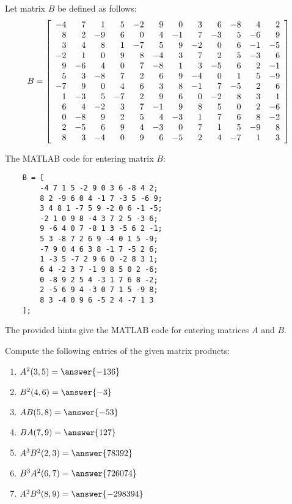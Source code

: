 \documentclass{ximera}
\begin{document}
\begin{exercise}
    Let matrix \( B \) be defined as follows:
    \[
    B = \startmat{rrrrrrrrrrrr}
        -4 & 7 & 1 & 5 & -2 & 9 & 0 & 3 & 6 & -8 & 4 & 2 \\
        8 & 2 & -9 & 6 & 0 & 4 & -1 & 7 & -3 & 5 & -6 & 9 \\
        3 & 4 & 8 & 1 & -7 & 5 & 9 & -2 & 0 & 6 & -1 & -5 \\
        -2 & 1 & 0 & 9 & 8 & -4 & 3 & 7 & 2 & 5 & -3 & 6 \\
        9 & -6 & 4 & 0 & 7 & -8 & 1 & 3 & -5 & 6 & 2 & -1 \\
        5 & 3 & -8 & 7 & 2 & 6 & 9 & -4 & 0 & 1 & 5 & -9 \\
        -7 & 9 & 0 & 4 & 6 & 3 & 8 & -1 & 7 & -5 & 2 & 6 \\
        1 & -3 & 5 & -7 & 2 & 9 & 6 & 0 & -2 & 8 & 3 & 1 \\
        6 & 4 & -2 & 3 & 7 & -1 & 9 & 8 & 5 & 0 & 2 & -6 \\
        0 & -8 & 9 & 2 & 5 & 4 & -3 & 1 & 7 & 6 & 8 & -2 \\
        2 & -5 & 6 & 9 & 4 & -3 & 0 & 7 & 1 & 5 & -9 & 8 \\
        8 & 3 & -4 & 0 & 9 & 6 & -5 & 2 & 4 & -7 & 1 & 3
    \stopmat
    \]
    
    \begin{hint}
    The MATLAB code for entering matrix \( B \):
    \begin{verbatim}
    B = [
        -4 7 1 5 -2 9 0 3 6 -8 4 2;
        8 2 -9 6 0 4 -1 7 -3 5 -6 9;
        3 4 8 1 -7 5 9 -2 0 6 -1 -5;
        -2 1 0 9 8 -4 3 7 2 5 -3 6;
        9 -6 4 0 7 -8 1 3 -5 6 2 -1;
        5 3 -8 7 2 6 9 -4 0 1 5 -9;
        -7 9 0 4 6 3 8 -1 7 -5 2 6;
        1 -3 5 -7 2 9 6 0 -2 8 3 1;
        6 4 -2 3 7 -1 9 8 5 0 2 -6;
        0 -8 9 2 5 4 -3 1 7 6 8 -2;
        2 -5 6 9 4 -3 0 7 1 5 -9 8;
        8 3 -4 0 9 6 -5 2 4 -7 1 3
    ];
    \end{verbatim}
    \end{hint}

The provided hints give the MATLAB code for entering matrices \( A \) and \( B \).

Compute the following entries of the given matrix products:


\begin{enumerate}

\item $A^2(3,5)=\answer{-136}$
\item $B^2(4,6)=\answer{-3}$
\item $AB(5,8)=\answer{-53}$
\item $BA(7,9)=\answer{127}$
\item $A^3B^2(2,3)=\answer{78392}$
\item $B^3A^2(6,7)=\answer{726074}$
\item $A^2B^3(8,9)=\answer{-298394}$

\end{enumerate}
    

\end{exercise}
\end{document}

